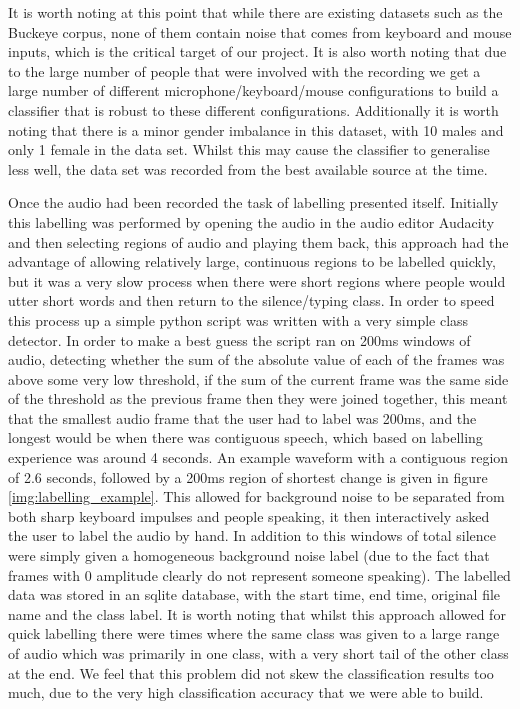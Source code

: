 \documentclass[ %
                    author={Sam Phippen},
                supervisor={Dr. Rafal Bogacz},
                     title={Real time voice activity detectors in noisy personal computing environments},
                  subtitle={},
                    degree={MEng},
                      year={2012} ]{thesis}
\begin{document}
It is worth noting at this point that while there are existing datasets such as
the Buckeye corpus\cite{buckeye}, none of them contain noise that comes from
keyboard and mouse inputs, which is the critical target of our project. It is
also worth noting that due to the large number of people that were involved
with the recording we get a large number of different microphone/keyboard/mouse
configurations to build a classifier that is robust to these different
configurations. Additionally it is worth noting that there is a minor gender
imbalance in this dataset, with 10 males and only 1 female in the data set.
Whilst this may cause the classifier to generalise less well, the data set was
recorded from the best available source at the time.

Once the audio had been recorded the task of labelling presented itself.
Initially this labelling was performed by opening the audio in the audio editor
Audacity\cite{audacity} and then selecting regions of audio and playing them
back, this approach had the advantage of allowing relatively large, continuous
regions to be labelled quickly, but it was a very slow process when there were
short regions where people would utter short words and then return to the
silence/typing class. In order to speed this process up a simple python script
was written with a very simple class detector. In order to make a best guess
the script ran on 200ms windows of audio, detecting whether the sum of the
absolute value of each of the frames was above some very low threshold, if the
sum of the current frame was the same side of the threshold as the previous
frame then they were joined together, this meant that the smallest audio frame
that the user had to label was 200ms, and the longest would be when there was
contiguous speech, which based on labelling experience was around 4 seconds. An
example waveform with a contiguous region of 2.6 seconds, followed by a 200ms
region of shortest change is given in figure \ref{img:labelling_example}. This
allowed for background noise to be separated from both sharp keyboard impulses
and people speaking, it then interactively asked the user to label the audio by
hand. In addition to this windows of total silence were simply given a
homogeneous background noise label (due to the fact that frames with 0
amplitude clearly do not represent someone speaking). The labelled data was
stored in an sqlite database, with the start time, end time, original file name
and the class label. It is worth noting that whilst this approach allowed for
quick labelling there were times where the same class was given to a large
range of audio which was primarily in one class, with a very short tail of the
other class at the end. We feel that this problem did not skew the
classification results too much, due to the very high classification accuracy
that we were able to build.
\end{document}
